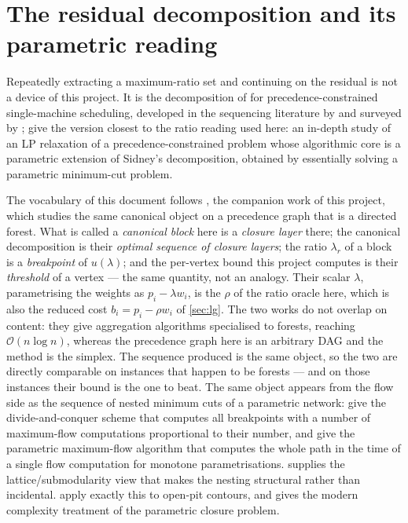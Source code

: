 \section{The residual decomposition and its parametric reading}\label{sec:parametric}

Repeatedly extracting a maximum-ratio set and continuing on the residual is not
a device of this project. It is the decomposition of \citet{Sidney1975} for
precedence-constrained single-machine scheduling, developed in the sequencing
literature by \citet{Lawler1978} and surveyed by \citet{CorreaSchulz2005};
\citet{MargotEtAl2003} give the version closest to the ratio reading used here:
an in-depth study of an LP relaxation of a precedence-constrained problem whose
algorithmic core is a parametric extension of Sidney's decomposition, obtained
by essentially solving a parametric minimum-cut problem.

The vocabulary of this document follows \citet{DoseEtAl2026}, the companion work
of this project, which studies the same canonical object on a precedence graph
that is a directed forest. What is called a \emph{canonical block} here is a
\emph{closure layer} there; the canonical decomposition is their \emph{optimal
sequence of closure layers}; the ratio $\lambda_r$ of a block is a
\emph{breakpoint} of $u(\lambda)$; and the per-vertex bound this project
computes is their \emph{threshold} of a vertex --- the same quantity, not an
analogy. Their scalar $\lambda$, parametrising the weights as $p_i - \lambda
w_i$, is the $\rho$ of the ratio oracle here, which is also the reduced cost
$b_i = p_i - \rho w_i$ of \cref{sec:lg}. The two works do not overlap on
content: they give aggregation algorithms specialised to forests, reaching
$\mathcal{O}(n\log n)$, whereas the precedence graph here is an arbitrary DAG
and the method is the simplex. The sequence produced is the same object, so the
two are directly comparable on instances that happen to be forests --- and on
those instances their bound is the one to beat.
The same object appears from the flow side as the sequence of nested minimum
cuts of a parametric network: \citet{EisnerSeverance1976} give the
divide-and-conquer scheme that computes all breakpoints with a number of
maximum-flow computations proportional to their number, and
\citet{GalloEtAl1989} give the parametric maximum-flow algorithm that computes
the whole path in the time of a single flow computation for monotone
parametrisations. \citet{Topkis1978} supplies the lattice/submodularity view
that makes the nesting structural rather than incidental.
\citet{PicardSmith2004} apply exactly this to open-pit contours, and
\citet{Eppstein2018} gives the modern complexity treatment of the parametric
closure problem.

